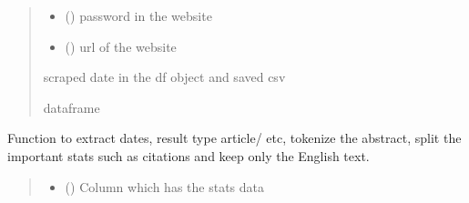 \documentclass[letterpaper,10pt,english]{sphinxmanual}
\begin{document}
\begin{fulllineitems}
\begin{fulllineitems}
\begin{quote}
\begin{description}
\begin{itemize}
\item {} 
\sphinxAtStartPar
{} () \textendash{} password in the website

\item {} 
\sphinxAtStartPar
{} () \textendash{} url of the website

\end{itemize}

\sphinxAtStartPar
scraped date in the df object and saved csv

\sphinxAtStartPar
dataframe

\end{description}\end{quote}

\end{fulllineitems}


\begin{fulllineitems}
\label{\detokenize{BeeLitReview:BeeLitReview.BeeLitReview.scraped_data_enhancement}}
\pysigstartsignatures
{}
\pysigstopsignatures
\sphinxAtStartPar
Function to extract dates, result type \sphinxhyphen{} article/ etc, tokenize the abstract, split the important stats such as citations and keep only the English text.
\begin{quote}\begin{description}
\begin{itemize}
\item {} 
\sphinxAtStartPar
{} () \textendash{} Column which has the stats data


\end{itemize}
\end{description}
\end{quote}
\end{fulllineitems}
\end{fulllineitems}
\end{document}
